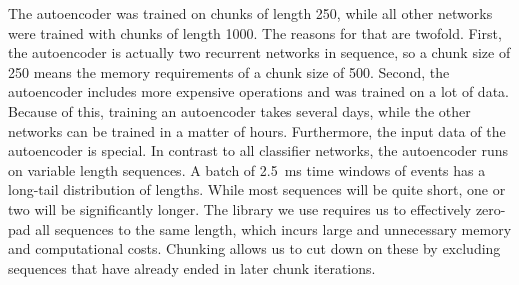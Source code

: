 The autoencoder was trained on chunks of length 250, while all other networks
were trained with chunks of length 1000. The reasons for that are twofold.
First, the autoencoder is actually two recurrent networks in sequence, so a
chunk size of 250 means the memory requirements of a chunk size of 500. Second,
the autoencoder includes more expensive operations and was trained on a lot of
data. Because of this, training an autoencoder takes several days, while the
other networks can be trained in a matter of hours. Furthermore, the input data
of the autoencoder is special. In contrast to all classifier networks, the
autoencoder runs on variable length sequences. A batch of
\SI{2.5}{\milli\second} time windows of events has a long-tail distribution of
lengths. While most sequences will be quite short, one or two will be
significantly longer. The library we use requires us to effectively zero-pad all
sequences to the same length, which incurs large and unnecessary memory and
computational costs. Chunking allows us to cut down on these by excluding
sequences that have already ended in later chunk iterations.

